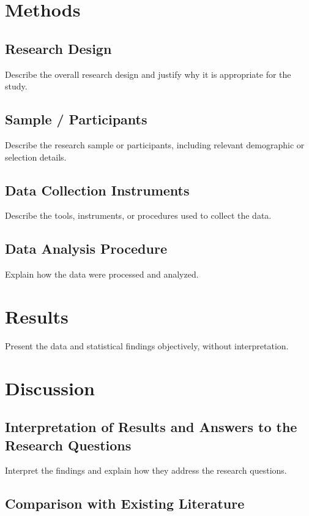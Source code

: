 \documentclass[11pt]{article}
\begin{document}
\section{Methods}

\subsection{Research Design}

Describe the overall research design and justify why it is appropriate for the study.

\subsection{Sample / Participants}

Describe the research sample or participants, including relevant demographic or selection details.

\subsection{Data Collection Instruments}

Describe the tools, instruments, or procedures used to collect the data.

\subsection{Data Analysis Procedure}

Explain how the data were processed and analyzed.

\section{Results}

Present the data and statistical findings objectively, without interpretation.

\section{Discussion}

\subsection{Interpretation of Results and Answers to the Research Questions}

Interpret the findings and explain how they address the research questions.

\subsection{Comparison with Existing Literature}
\end{document}
